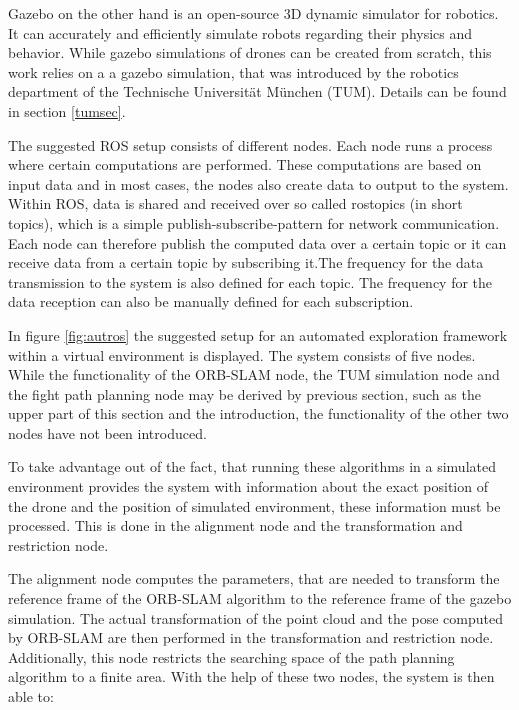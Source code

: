 	Gazebo on the other hand is an open-source 3D dynamic simulator for robotics. It can accurately and efficiently simulate robots regarding
	their physics and behavior. While gazebo simulations of drones can be created from scratch, this work relies on a a gazebo simulation, that was introduced 
	by the robotics department of the Technische Universität München (TUM). Details can be found in section \ref{tumsec}.
	
	The suggested ROS setup consists of different nodes. Each node runs a process where certain computations are performed. These computations are based on input data
	and in most cases, the nodes also create data to output to the system. Within ROS, data is shared and received over so called rostopics (in short topics), which is a simple publish-subscribe-pattern 
	for network communication. Each node can therefore publish the computed 
	data over a certain topic or it can receive data from a certain topic by subscribing it.The frequency for the data transmission to the system is 
	also defined for each topic. The frequency  for the data reception can also be manually defined for each subscription.
	
	
	In figure \ref{fig:autros} the suggested setup for an automated exploration framework within a virtual environment is displayed. The system consists of five nodes. 
	While the functionality of the ORB-SLAM node, the TUM simulation node and the fight path planning node may be derived by previous section, such as the upper part of 
	this section and the introduction, the functionality of the other two nodes have not been introduced. 
	
	To take advantage out of the fact, that running these algorithms in a simulated environment provides the system with information about the exact position of the 
	drone and the position of simulated environment, these information must be processed. This is done in the alignment node and the transformation and restriction node. 
	
	The alignment node computes the parameters, that are needed to transform the reference frame of the ORB-SLAM algorithm to the reference frame of the gazebo simulation. 
	The actual transformation of the point cloud and the pose computed by ORB-SLAM are then performed in the transformation and restriction node. Additionally, this node 
	restricts the searching space of the path planning algorithm to a finite area. With the help of these two nodes, the system is then able to: 
	
